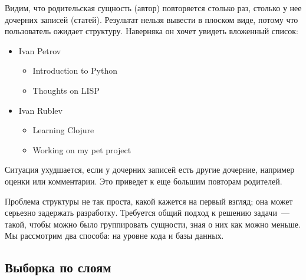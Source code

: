 
Видим, что родительская сущность (автор) повторяется столько раз, столько у нее дочерних записей (статей). Результат нельзя вывести в плоском виде, потому что пользователь ожидает структуру. Наверняка он хочет увидеть вложенный список:

\begin{itemize}
\item
  Ivan Petrov
  \begin{itemize}
    \item
      Introduction to Python
    \item
      Thoughts on LISP
  \end{itemize}
\item
  Ivan Rublev
  \begin{itemize}
    \item
      Learning Clojure
    \item
      Working on my pet project
  \end{itemize}
\end{itemize}

Ситуация ухудшается, если у дочерних записей есть другие дочерние, например оценки или комментарии. Это приведет к еще большим повторам родителей.

Проблема структуры не так проста, какой кажется на первый взгляд; она может серьезно задержать разработку. Требуется общий подход к решению задачи~--- такой, чтобы можно было группировать сущности, зная о них как можно меньше. Мы рассмотрим два способа: на уровне кода и базы данных.

\subsection{Выборка по слоям}

